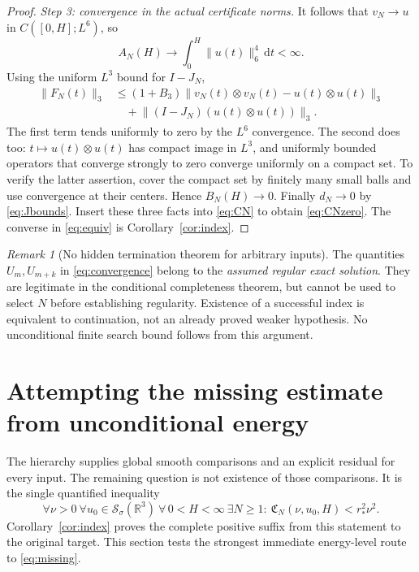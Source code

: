 \documentclass[11pt,a4paper]{article}
\theoremstyle{definition}\newtheorem{definition}[theorem]{Definition}
\theoremstyle{remark}\newtheorem{remark}[theorem]{Remark}
\newcommand{\R}{\mathbb R}
\newcommand{\dd}{\,\mathrm d}
\newcommand{\norm}[1]{\lVert #1\rVert}
\newcommand{\Sch}{\mathcal S_\sigma(\R^3)}
\newcommand{\rstar}{r_*}
\numberwithin{equation}{section}
\begin{document}
\begin{proof}
\emph{Step 3: convergence in the actual certificate norms.}
It follows that $v_N\to u$ in $C([0,H];L^6)$, so
\[
 A_N(H)\longrightarrow\int_0^H\norm{u(t)}_6^4\dd t<\infty.
\]
Using the uniform $L^3$ bound for $I-J_N$,
\begin{align*}
 \norm{F_N(t)}_3
 &\le(1+B_3)\norm{v_N(t)\otimes v_N(t)-u(t)\otimes u(t)}_3\\
 &\quad+\norm{(I-J_N)(u(t)\otimes u(t))}_3.
\end{align*}
The first term tends uniformly to zero by the $L^6$ convergence. The second does too: $t\mapsto u(t)\otimes u(t)$ has compact image in $L^3$, and uniformly bounded operators that converge strongly to zero converge uniformly on a compact set. To verify the latter assertion, cover the compact set by finitely many small balls and use convergence at their centers. Hence $B_N(H)\to0$. Finally $d_N\to0$ by \eqref{eq:Jbounds}. Insert these three facts into \eqref{eq:CN} to obtain \eqref{eq:CNzero}. The converse in \eqref{eq:equiv} is Corollary~\ref{cor:index}.
\end{proof}

\begin{remark}[No hidden termination theorem for arbitrary inputs]
The quantities $U_m,U_{m+k}$ in \eqref{eq:convergence} belong to the \emph{assumed regular exact solution}. They are legitimate in the conditional completeness theorem, but cannot be used to select $N$ before establishing regularity. Existence of a successful index is equivalent to continuation, not an already proved weaker hypothesis. No unconditional finite search bound follows from this argument.
\end{remark}

\section{Attempting the missing estimate from unconditional energy}
\label{sec:gap}
The hierarchy supplies global smooth comparisons and an explicit residual for every input. The remaining question is not existence of those comparisons. It is the single quantified inequality
\begin{equation}\label{eq:missing}
 \boxed{\ \forall\nu>0\ \forall u_0\in\Sch\ \forall\,0<H<\infty\
 \exists N\ge1:\ \mathfrak C_N(\nu,u_0,H)<\rstar^2\nu^2.\ }
\end{equation}
Corollary~\ref{cor:index} proves the complete positive suffix from this statement to the original target. This section tests the strongest immediate energy-level route to \eqref{eq:missing}.
\end{document}
